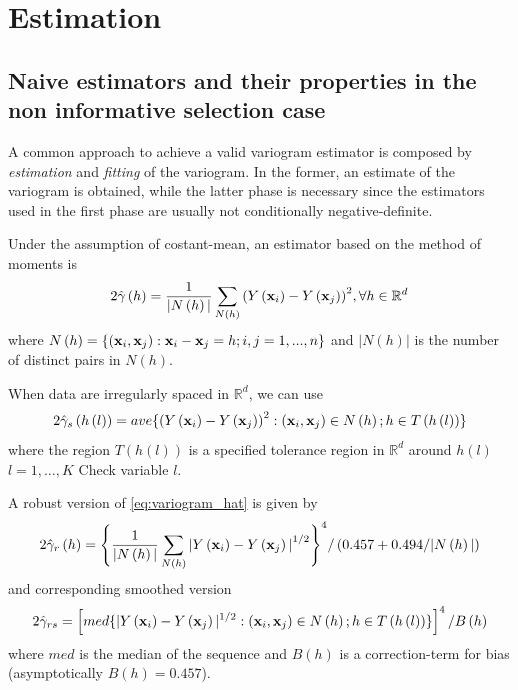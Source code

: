 \section{Estimation} \label{sec:estimation}

\subsection{Naive estimators and their properties in the non informative selection case}
A common approach to achieve a valid variogram estimator is composed by \emph{estimation} and \emph{fitting} of the variogram. In the former, an estimate of the variogram is obtained, while the latter phase is necessary since the estimators used in the first phase are usually not conditionally negative-definite.

Under the assumption of costant-mean, an estimator based on the method of moments is \citep{matheron1962traite}
\begin{equation} \label{eq:variogram_hat}
2\hat{\gamma}\left(h\right)=\frac{1}{|N\left(h\right)|}\sum_{N\left(h\right)}{\left(Y\left(\mathbf{x}_{i}\right)-Y\left(\mathbf{x}_{j}\right)\right)^{2}},\forall h\in\mathbb{R}^{d}
\end{equation}
where $N\left(h\right)=\lbrace\left(\mathbf{x}_{i},\mathbf{x}_{j}\right):\mathbf{x}_{i}-\mathbf{x}_{j}=h;i,j=1,...,n\rbrace$ and $|N\left(h\right)|$ is the number of distinct pairs in $N\left(h\right)$. 

When data are irregularly spaced in $\mathbb{R}^{d}$, we can use
\begin{equation} \label{eq:variogram_hat1}
2\hat{\gamma}_{s}\left(h\left(l\right)\right)=ave\lbrace\left(Y\left(\mathbf{x}_{i}\right)-Y\left(\mathbf{x}_{j}\right)\right)^{2}:\left(\mathbf{x}_{i},\mathbf{x}_{j}\right)\in N\left(h\right);h\in T\left(h\left(l\right)\right)\rbrace
\end{equation}
where the region $T\left(h\left(l\right)\right)$ is a specified tolerance region in $\mathbb{R}^{d}$ around $h\left(l\right)$ $l=1,\dots,K$ {\color{red} Check variable $l$}.

A robust version of \eqref{eq:variogram_hat} is given by \citep{cressie1980robust}
\begin{equation} \label{eq:variogram_hat_robust}
2\hat{\gamma}_{r}\left(h\right)=\Bigg\lbrace\frac{1}{|N\left(h\right)|}\sum_{N\left(h\right)}{|Y\left(\mathbf{x}_{i}\right)-Y\left(\mathbf{x}_{j}\right)|}^{1/2}\Bigg\rbrace ^{4}
/ \left(0.457 + 0.494/|N\left(h\right)|\right)
\end{equation} 
and corresponding smoothed version
\begin{equation}
2\hat{\gamma}_{rs}=\left[med\lbrace|Y\left(\mathbf{x}_{i}\right)-Y\left(\mathbf{x}_{j}\right)|^{1/2}:\left(\mathbf{x}_{i},\mathbf{x}_{j}\right)\in N\left(h\right);h\in T\left(h\left(l\right)\right)\rbrace\right]^{4}/B\left(h\right)
\end{equation}
where $med$ is the median of the sequence and $B\left(h\right)$ is a correction-term for bias (asymptotically $B\left(h\right)=0.457$).

